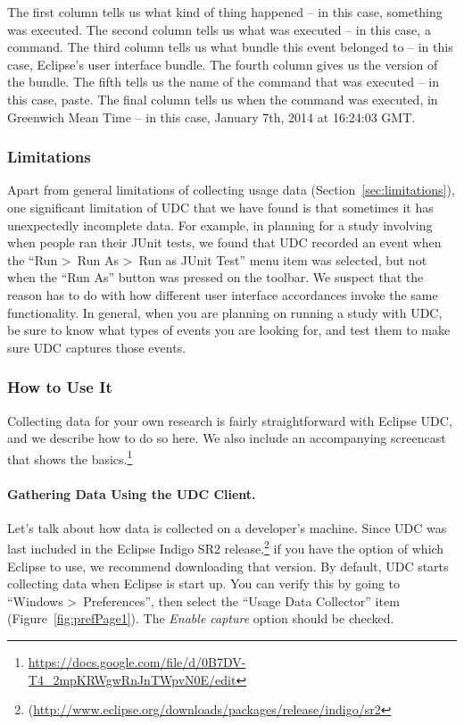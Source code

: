 \vspace{4mm}
\noindent
The first column tells us what kind of thing happened -- in this case, something was executed.
The second column tells us what was executed -- in this case, a command.
The third column tells us what bundle this event belonged to -- in this case, Eclipse's user interface bundle.
The fourth column gives us the version of the bundle.
The fifth tells us the name of the command that was executed -- in this case, paste.
The final column tells us when the command was executed, in Greenwich Mean Time -- in this case, January 7th, 2014 at 16:24:03 GMT.


\subsubsection{Limitations}

Apart from general limitations of collecting usage data (Section~\ref{sec:limitations}),
one significant limitation of UDC that we have found is that sometimes it has 
unexpectedly incomplete data.
For example, in planning for a study involving when people ran their JUnit tests,
we found that UDC recorded an event when the ``Run \textgreater~Run As \textgreater~Run as JUnit Test'' menu item was selected,
but not when the ``Run As'' button was pressed on the toolbar.
We suspect that the reason has to do with how different user interface accordances
invoke the same functionality.
In general, when you are planning on running a study with UDC, be sure to know what 
types of events you are looking for, and test them to make sure UDC captures those events.

\subsubsection{How to Use It}

\label{SecUDCHowToUseIt}

Collecting data for your own research is fairly straightforward with Eclipse UDC,
and we describe how to do so here.
We also include an accompanying screencast that shows the 
basics.\footnote{\url{https://docs.google.com/file/d/0B7DV-T4_2mpKRWgwRnJnTWpvN0E/edit}}

\paragraph{Gathering Data Using the UDC Client.}

Let's talk about how data is collected on a developer's machine.
Since UDC was last included in the Eclipse Indigo SR2 
release,\footnote{(\url{http://www.eclipse.org/downloads/packages/release/indigo/sr2}}
if you have the option of which Eclipse to use, we recommend downloading
that version.
By default, UDC starts collecting data when Eclipse is start up. 
You can verify this by going to ``Windows \textgreater~Preferences'', then
select the ``Usage Data Collector'' item (Figure~\ref{fig:prefPage1}).
The \textit{Enable capture} option should be checked.

